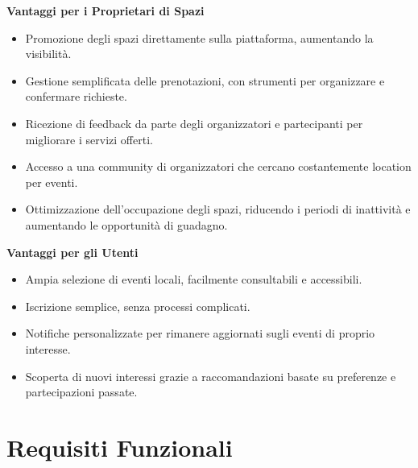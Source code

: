 \documentclass[9pt]{extarticle}
\begin{document}
\textbf{Vantaggi per i Proprietari di Spazi}
\begin{itemize}
	\item Promozione degli spazi direttamente sulla piattaforma, aumentando la visibilità.
	\item Gestione semplificata delle prenotazioni, con strumenti per organizzare e confermare richieste.
	\item Ricezione di feedback da parte degli organizzatori e partecipanti per migliorare i servizi offerti.
	\item Accesso a una community di organizzatori che cercano costantemente location per eventi.
	\item Ottimizzazione dell'occupazione degli spazi, riducendo i periodi di inattività e aumentando le opportunità di guadagno.
\end{itemize}

\textbf{Vantaggi per gli Utenti}
\begin{itemize}
	\item Ampia selezione di eventi locali, facilmente consultabili e accessibili.
	\item Iscrizione semplice, senza processi complicati.
	\item Notifiche personalizzate per rimanere aggiornati sugli eventi di proprio interesse.
	\item Scoperta di nuovi interessi grazie a raccomandazioni basate su preferenze e partecipazioni passate.
\end{itemize}

\section{Requisiti Funzionali}
\end{document}
